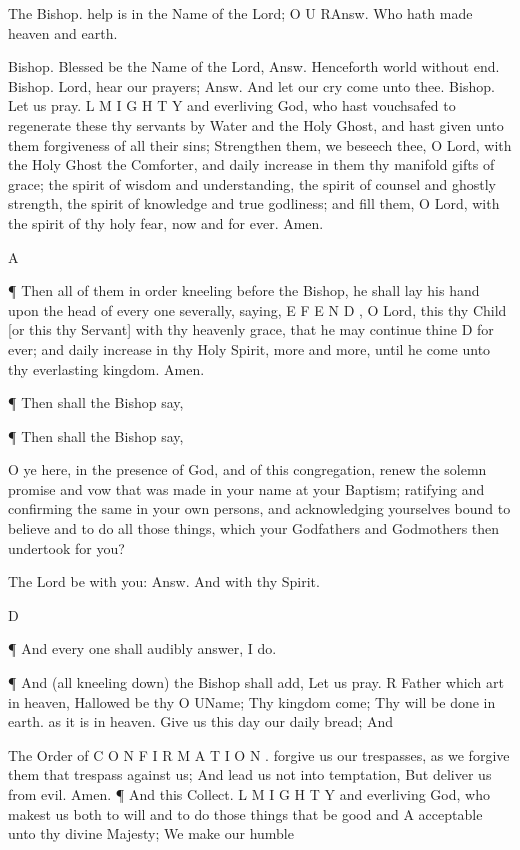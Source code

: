 The Bishop. help is in the Name of the Lord; O U RAnsw. Who hath made heaven and earth.

Bishop. Blessed be the Name of the Lord, Answ. Henceforth world without end. Bishop. Lord, hear our prayers; Answ. And let our cry come unto thee. Bishop. Let us pray. L M I G H T Y and everliving God, who hast vouchsafed to regenerate these thy servants by Water and the Holy Ghost, and hast given unto them forgiveness of all their sins; Strengthen them, we beseech thee, O Lord, with the Holy Ghost the Comforter, and daily increase in them thy manifold gifts of grace; the spirit of wisdom and understanding, the spirit of counsel and ghostly strength, the spirit of knowledge and true godliness; and fill them, O Lord, with the spirit of thy holy fear, now and for ever. Amen.

A

¶ Then all of them in order kneeling before the Bishop, he shall lay his hand upon the head of every one severally, saying, E F E N D , O Lord, this thy Child [or this thy Servant] with thy heavenly grace, that he may continue thine D for ever; and daily increase in thy Holy Spirit, more and more, until he come unto thy everlasting kingdom. Amen.

¶ Then shall the Bishop say,

¶ Then shall the Bishop say,

O ye here, in the presence of God, and of this congregation, renew the solemn promise and vow that was made in your name at your Baptism; ratifying and confirming the same in your own persons, and acknowledging yourselves bound to believe and to do all those things, which your Godfathers and Godmothers then undertook for you?

The Lord be with you: Answ. And with thy Spirit.

D

¶ And every one shall audibly answer, I do.

¶ And (all kneeling down) the Bishop shall add, Let us pray. R Father which art in heaven, Hallowed be thy O UName; Thy kingdom come; Thy will be done in earth. as it is in heaven. Give us this day our daily bread; And

The Order of C O N F I R M A T I O N . forgive us our trespasses, as we forgive them that trespass against us; And lead us not into temptation, But deliver us from evil. Amen. ¶ And this Collect. L M I G H T Y and everliving God, who makest us both to will and to do those things that be good and A acceptable unto thy divine Majesty; We make our humble

